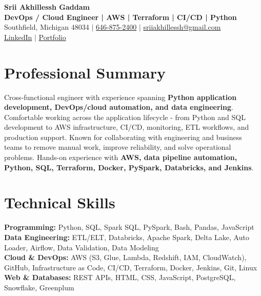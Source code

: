 \documentclass[letterpaper,10pt]{article}
\begin{document}
\fontsize{9.35pt}{10.45pt}\selectfont

\begin{center}
    {\LARGE \textbf{Srii Akhillessh Gaddam}} \\[-1pt]
    \textbf{DevOps / Cloud Engineer | AWS | Terraform | CI/CD | Python} \\[2pt]
    Southfield, Michigan 48034 $|$
    \href{tel:6468752400}{646-875-2400} $|$
    \href{mailto:sriiakhillessh@gmail.com}{sriiakhillessh@gmail.com} \\[1pt]
    \href{https://www.linkedin.com/in/srii-akhiilessh-gaddam-b48668191/}{LinkedIn} $|$
    \href{https://sriiakhillesshg.github.io/portfolio/}{Portfolio}
\end{center}
\vspace{-8pt}

\section{Professional Summary}
\small{Cross-functional engineer with experience spanning \textbf{Python application development, DevOps/cloud automation, and data engineering}. Comfortable working across the application lifecycle - from Python and SQL development to AWS infrastructure, CI/CD, monitoring, ETL workflows, and production support. Known for collaborating with engineering and business teams to remove manual work, improve reliability, and solve operational problems. Hands-on experience with \textbf{AWS, data pipeline automation, Python, SQL, Terraform, Docker, PySpark, Databricks, and Jenkins}.}

\section{Technical Skills}
\small{
\textbf{Programming:} Python, SQL, Spark SQL, PySpark, Bash, Pandas, JavaScript \\
\textbf{Data Engineering:} ETL/ELT, Databricks, Apache Spark, Delta Lake, Auto Loader, Airflow, Data Validation, Data Modeling \\
\textbf{Cloud \& DevOps:} AWS (S3, Glue, Lambda, Redshift, IAM, CloudWatch), GitHub, Infrastructure as Code, CI/CD, Terraform, Docker, Jenkins, Git, Linux \\
\textbf{Web \& Databases:} REST APIs, HTML, CSS, JavaScript, PostgreSQL, Snowflake, Greenplum
}
\end{document}
